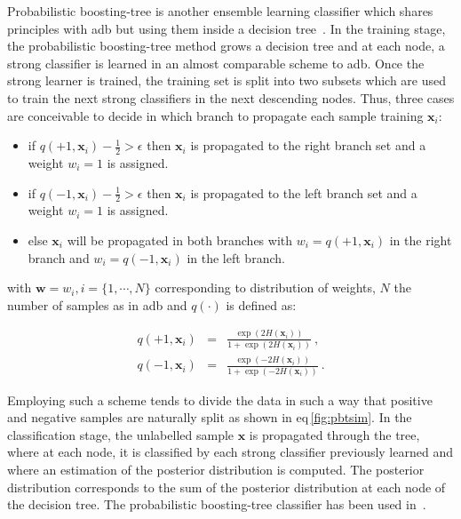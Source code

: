 Probabilistic boosting-tree is another ensemble learning classifier which shares principles with \ac{adb} but using them inside a decision tree~\cite{Tu2005}. 
In the training stage, the probabilistic boosting-tree method grows a decision tree and at each node, a strong classifier is learned in an almost comparable scheme to \ac{adb}.
Once the strong learner is trained, the training set is split into two subsets which are used to train the next strong classifiers in the next descending nodes.
Thus, three cases are conceivable to decide in which branch to propagate each sample training $\mathbf{x}_i$:

\begin{itemize}
	\item if $q(+1, \mathbf{x}_i) - \frac{1}{2} > \epsilon$ then $\mathbf{x}_i$ is propagated to the right branch set and a weight $w_i=1$ is assigned. 
	\item if $q(-1, \mathbf{x}_i) - \frac{1}{2} > \epsilon$ then $\mathbf{x}_i$ is propagated to the left branch set and a weight $w_i=1$ is assigned.
	\item else $\mathbf{x}_i$ will be propagated in both branches with $w_i=q(+1, \mathbf{x}_i)$ in the right branch and $w_i=q(-1, \mathbf{x}_i)$ in the left branch.
\end{itemize}

\noindent with $\mathbf{w} = w_i, i=\{1,\cdots,N\}$ corresponding to distribution of weights, $N$ the number of samples as in \ac{adb} and $q(\cdot)$ is defined as:

\begin{eqnarray}
	q(+1, \mathbf{x}_i) & = & \frac{\exp(2H(\mathbf{x}_i))}{1+\exp(2H(\mathbf{x}_i))} \ , \label{eq:regada1} \\
	q(-1, \mathbf{x}_i) & = & \frac{\exp(-2H(\mathbf{x}_i))}{1+\exp(-2H(\mathbf{x}_i))} \ . \label{eq:regada2}
\end{eqnarray}

Employing such a scheme tends to divide the data in such a way that positive and negative samples are naturally split as shown in \acs{eq}\,\ref{fig:pbtsim}.
In the classification stage, the unlabelled sample $\mathbf{x}$ is propagated through the tree, where at each node, it is classified by each strong classifier previously learned and where an estimation of the posterior distribution is computed.
The posterior distribution corresponds to the sum of the posterior distribution at each node of the decision tree.
The probabilistic boosting-tree classifier has been used in~\cite{Tiwari2009a,Tiwari2012,Tiwari2010,Viswanath2011}.

